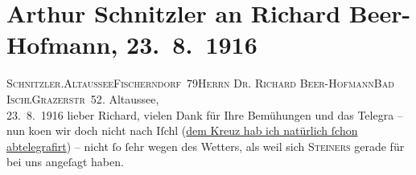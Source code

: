 

         
         \renewcommand{\erwaehntePersonen}{Personen: Richard Beer-Hofmann, Arthur Kaufmann, Olga Schnitzler, Franz Steiner, Margit Steiner, Elisabeth Steinrück}
         \renewcommand{\erwaehnteOrte}{Orte: Altaussee, Bad Ischl, Fischerndorf, Goldenes Kreuz, Grazer Straße, Partenkirchen, Salzburg}
         \renewcommand{\erwaehnteWerke}{}
               \section[Arthur Schnitzler an Richard Beer-Hofmann, 23. 8. 1916]{ Arthur Schnitzler an Richard Beer-Hofmann, 23. 8. 1916}\nopagebreak{}\rehead{ }\begin{ledgroupsized}[t]{13cm}\normalsize\beginnumbering \toendnotes[C]{\smallbreak\pagebreak[2]} 
\toendnotes[C]{\smallbreak}\pstart{}{\pb}\textsc{Schnitzler}.\pend{}\pstart{}\textsc{Altaussee}\pend{}\pstart{}\textsc{Fischerndorf 79}\pend{}{\bigskip}\pstart{}\textsc{Herrn Dr. Richard Beer-Hofmann}\pend{}\pstart{}\textsc{Bad Ischl}\pend{}\pstart{}\textsc{Grazerstr 52}.\pend{}{\bigskip}\pstart
           \raggedleft{}{\pb}Altaussee,{\\}23. 8. 1916\pend
           \pstart
           lieber Richard, vielen Dank für Ihre Bemühungen und das Telegra{\geminationm} – nun ko{\geminationm}en wir doch
               nicht nach Iſchl (\uline{dem
                     Kreuz hab ich natürlich ſchon
                  abtelegrafirt}) – nicht ſo ſehr wegen des Wetters, als weil sich \textsc{Steiners} gerade für \label{K_L02239-1v}\label{K_L02239-1h} bei uns angeſagt haben.\pend

\end{ledgroupsized}
